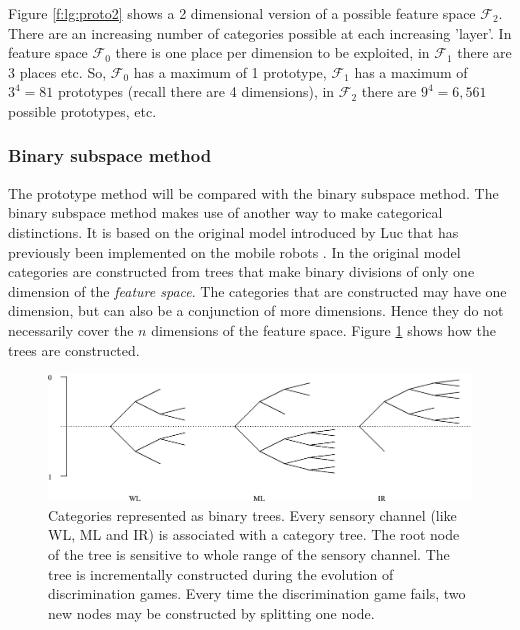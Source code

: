 Figure \ref{f:lg:proto2} shows a 2 dimensional version of a possible feature space ${\mathcal F}_2$. There are an increasing number of categories possible at each increasing 'layer'. In feature space ${\mathcal F}_0$ there is one place per dimension to be exploited, in ${\mathcal F}_1$ there are 3 places etc. So, ${\mathcal F}_0$ has a maximum of 1 prototype, ${\mathcal F}_1$ has a maximum of $3^4=81$ prototypes (recall there are 4 dimensions), in ${\mathcal F}_2$ there are $9^4=6,561$ possible prototypes, etc. 


\subsubsection{Binary subspace method}\label{s:cm:binary}

The prototype method will be compared with the binary subspace method. The binary subspace method makes use of another way to make categorical distinctions. It is based on the original model introduced by Luc \citet{steels:1996b} that has previously been implemented on the mobile robots \citep{steelsvogt:1997,vogt:1998a}. In the original model categories are constructed from trees that make binary divisions of only one dimension of the {\em feature space}. The categories that are constructed may have one dimension, but can also be a conjunction of more dimensions. Hence they do not necessarily cover the $n$ dimensions of the feature space. Figure \ref{f:lg:binarytree} shows how the trees are constructed.


\begin{figure}[t]
\centerline{\includegraphics[width=12cm]{discr_games/binary_tree.eps}}
\caption{Categories represented as binary trees. Every sensory channel (like WL, ML and IR) is associated with a category tree. The root node of the tree is sensitive to whole range of the sensory channel. The tree is incrementally constructed during the evolution of discrimination games. Every time the discrimination game fails, two new nodes may be constructed by splitting one node.}
\label{f:lg:binarytree}
\end{figure}

